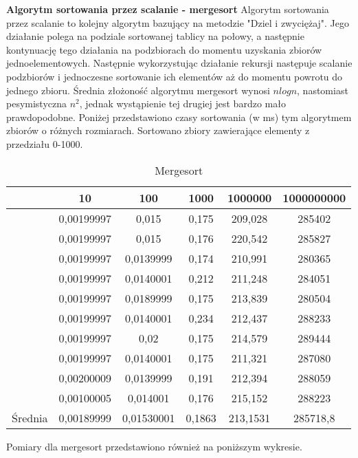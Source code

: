 \documentclass[10pt, a4paper]{article}
\begin{document}
\begin{flushleft}
\textbf{Algorytm sortowania przez scalanie - mergesort} \newline \newline
Algorytm sortowania przez scalanie to kolejny algorytm bazujący na metodzie "Dziel i zwyciężaj". Jego działanie polega na podziale sortowanej tablicy na połowy, a następnie kontynuację tego działania na podzbiorach do momentu uzyskania zbiorów jednoelementowych. Następnie wykorzystując działanie rekursji następuje scalanie podzbiorów i jednoczesne sortowanie ich elementów aż do momentu powrotu do jednego zbioru. Średnia złożoność algorytmu mergesort wynosi $nlogn$, nastomiast pesymistyczna $n^2$, jednak wystąpienie tej drugiej jest bardzo mało prawdopodobne. Poniżej przedstawiono czasy sortowania (w ms) tym algorytmem zbiorów o różnych rozmiarach. Sortowano zbiory zawierające elementy z przedziału 0-1000. \newline \newline

\begin{table}[h]
\centering
\caption{Mergesort}
\begin{tabular}{|c|c|c|c|c|c|} \hline
& 10 & 100 & 1000 & 1000000 & 1000000000 \\ \hline
& 0,00199997 & 0,015 & 0,175 & 209,028 & 285402 \\
& 0,00199997 & 0,015 & 0,176 & 220,542 & 285827 \\
& 0,00199997 & 0,0139999 & 0,174 & 210,991 & 280365 \\
& 0,00199997 & 0,0140001 & 0,212 & 211,248 & 284051 \\
& 0,00199997 & 0,0189999 & 0,175 & 213,839 & 280504 \\
& 0,00199997 & 0,0140001 & 0,234 & 212,437 & 288233 \\
& 0,00199997 & 0,02 & 0,175 & 214,579 & 289444 \\
& 0,00199997 & 0,0140001 & 0,175 & 211,321 & 287080 \\
& 0,00200009 & 0,0139999 & 0,191 & 212,394 & 288059 \\
& 0,00100005 & 0,014001 & 0,176 & 215,152 & 288223 \\ \hline
Średnia & 0,00189999 & 0,01530001 & 0,1863 & 213,1531 & 285718,8 \\ \hline
\end{tabular}
\end{table}

Pomiary dla mergesort przedstawiono również na poniższym wykresie. \newline


\end{flushleft}
\end{document}
